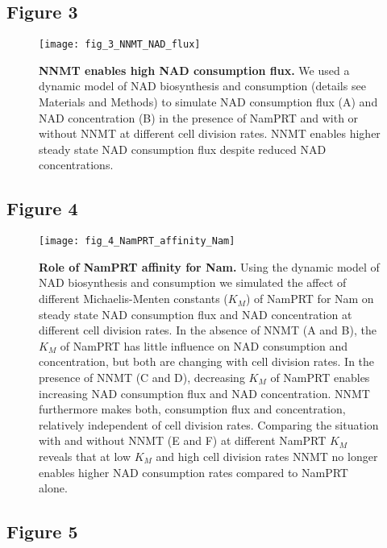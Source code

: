 \newpage


\subsection{Figure 3}

\begin{figure}[ht]
  \centering
  \texttt{[image: fig\_3\_NNMT\_NAD\_flux]}
  \caption{\textbf{NNMT enables high NAD consumption flux.} We used a dynamic model of NAD biosynthesis and consumption (details see Materials and Methods) to simulate NAD consumption flux (A) and NAD concentration (B) in the presence of NamPRT and with or without NNMT at different cell division rates. NNMT enables higher steady state NAD consumption flux despite reduced NAD concentrations.}
  \label{fig:NNMT_NAD_flux}
\end{figure}

\newpage


\subsection{Figure 4}

\begin{figure}[ht]
  \centering
  \texttt{[image: fig\_4\_NamPRT\_affinity\_Nam]}
  \caption{\textbf{Role of NamPRT affinity for Nam.} Using the dynamic model of NAD biosynthesis and consumption we simulated the affect of different Michaelis-Menten constants ($K_M$) of NamPRT for Nam on steady state NAD consumption flux and NAD concentration at different cell division rates. In the absence of NNMT (A and B), the $K_M$ of NamPRT has little influence on NAD consumption and concentration, but both are changing with cell division rates. In the presence of NNMT (C and D), decreasing $K_M$ of NamPRT enables increasing NAD consumption flux and NAD concentration. NNMT furthermore makes both, consumption flux and concentration, relatively independent of cell division rates. Comparing the situation with and without NNMT (E and F) at different NamPRT $K_M$ reveals that at low $K_M$ and high cell division rates NNMT no longer enables higher NAD consumption rates compared to NamPRT alone.}
  \label{fig:NamPRT_affinity_Nam}
\end{figure}

\newpage


\subsection{Figure 5}

